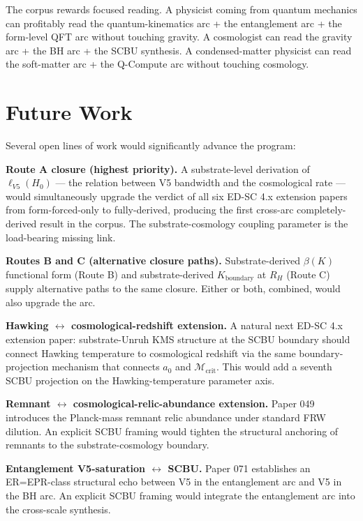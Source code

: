\documentclass[11pt,a4paper]{article}
\begin{document}
The corpus rewards focused reading. A physicist coming from quantum mechanics can profitably read the quantum-kinematics arc + the entanglement arc + the form-level QFT arc without touching gravity. A cosmologist can read the gravity arc + the BH arc + the SCBU synthesis. A condensed-matter physicist can read the soft-matter arc + the Q-Compute arc without touching cosmology.

\section{Future Work}

Several open lines of work would significantly advance the program:

\textbf{Route A closure (highest priority).} A substrate-level derivation of $\ell_{V5}(H_0)$ --- the relation between V5 bandwidth and the cosmological rate --- would simultaneously upgrade the verdict of all six ED-SC 4.x extension papers from form-forced-only to fully-derived, producing the first cross-arc completely-derived result in the corpus. The substrate-cosmology coupling parameter is the load-bearing missing link.

\textbf{Routes B and C (alternative closure paths).} Substrate-derived $\beta(K)$ functional form (Route B) and substrate-derived $K_\mathrm{boundary}$ at $R_H$ (Route C) supply alternative paths to the same closure. Either or both, combined, would also upgrade the arc.

\textbf{Hawking $\leftrightarrow$ cosmological-redshift extension.} A natural next ED-SC 4.x extension paper: substrate-Unruh KMS structure at the SCBU boundary should connect Hawking temperature to cosmological redshift via the same boundary-projection mechanism that connects $a_0$ and $\mathcal{M}_\mathrm{crit}$. This would add a seventh SCBU projection on the Hawking-temperature parameter axis.

\textbf{Remnant $\leftrightarrow$ cosmological-relic-abundance extension.} Paper 049 introduces the Planck-mass remnant relic abundance under standard FRW dilution. An explicit SCBU framing would tighten the structural anchoring of remnants to the substrate-cosmology boundary.

\textbf{Entanglement V5-saturation $\leftrightarrow$ SCBU.} Paper 071 establishes an ER=EPR-class structural echo between V5 in the entanglement arc and V5 in the BH arc. An explicit SCBU framing would integrate the entanglement arc into the cross-scale synthesis.
\end{document}
